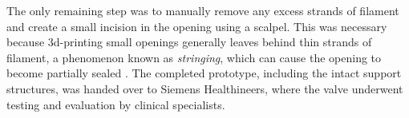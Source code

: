 The only remaining step was to manually remove any excess strands of filament and create a small incision in the opening using a scalpel. This was necessary because \gls{3d}-printing small openings generally leaves behind thin strands of filament, a phenomenon known as \emph{stringing}, which can cause the opening to become partially sealed \cite{prusa_stringing_oozing}. The completed prototype, including the intact support structures, was handed over to Siemens Healthineers, where the valve underwent testing and evaluation by clinical specialists.